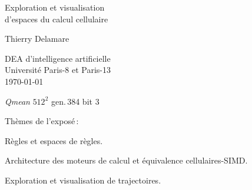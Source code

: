 \documentclass[a4paper,dvips]{slides}
\renewcommand{\arule}[1]{\emph{\mbox{#1}}} %
\renewcommand{\asquare}[1]{\ensuremath{#1^{2}}}
\newcommand{\agen}[1]{gen.\,#1}
\newcommand{\aplane}[1]{bit #1}
\newcommand{\mytitle}[1]{\begin{center}\begin{large}#1\end{large}\end{center}}
\begin{document}
\addtolength{\textheight}{\topmargin}
\addtolength{\textheight}{\headheight}
\addtolength{\textheight}{\headsep}
\addtolength{\textheight}{\footskip}

\setlength{\topmargin}{0pt}
\setlength{\headheight}{0pt}
\setlength{\headsep}{0pt}
\setlength{\footskip}{0pt}


\begin{center}
  \begin{Large}
    Exploration et visualisation\\
    d'espaces du calcul cellulaire
  \end{Large}
  \bigskip
  \begin{large}
    Thierry Delamare\\
  \end{large}
  \bigskip
  \bigskip
  DEA d'intelligence artificielle\\
  Universit\'e Paris-8 et Paris-13\\
  \bigskip
  \today
  \bigskip
\end{center}
\bigskip
\bigskip
\bigskip
{}%
{\arule{Qmean} \asquare{512} \agen{384} \aplane{3}}


\begin{slide}
  \begin{center}
    \begin{Large}
      Th\`emes de l'expos\'e\,:
    \end{Large}
  \end{center}
  
  R\`egles et espaces de r\`egles.
  
  Architecture des moteurs de calcul et \'equi\-valence cellulaires-SIMD.
  
  Exploration et visualisation de trajectoires.
\end{slide}
\end{document}
